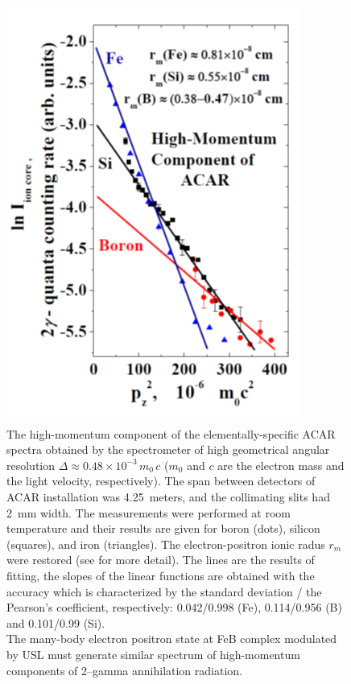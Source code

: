 \documentclass{ttp}
\begin{document}
\begin{figure}
	\centering
     \includegraphics[width=\linewidth]{Fig6.png}
	  \caption{The high-momentum component of the elementally-specific ACAR spectra
        obtained by the spectrometer of high geometrical angular resolution $\Delta \approx 0.48 \times 10^{-3}\,m_0\,c$
        ($m_0$ and $c$ are the electron mass and the light velocity, respectively).
        The span between detectors of ACAR installation was 4.25~meters, and the collimating slits had 2~mm width.
        The measurements were performed at room temperature and their results are given
        for boron (dots), silicon (squares), and iron (triangles).
        The electron-positron ionic radus $r_m$ were restored (see \cite{Arutyunov2016,Arutyunov2006,Arutyunov2008} for more detail).
        The lines are the results of fitting, the slopes of the linear functions are obtained with the accuracy
        which is characterized by the standard deviation / the Pearson’s coefficient, respectively:
        0.042/0.998 (Fe), 0.114/0.956 (B) and 0.101/0.99 (Si).\\
        The many-body electron positron state at FeB complex modulated by USL must generate
        similar spectrum of high-momentum components of 2–gamma annihilation radiation.
}\label{fig6}
\end{figure}
\end{document}
